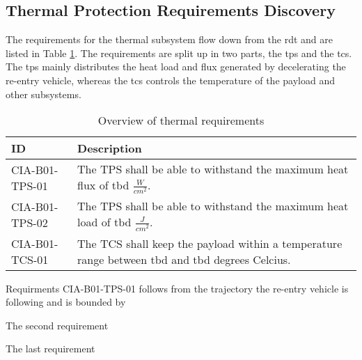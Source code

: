 \subsection{Thermal Protection Requirements Discovery} \label{sec:therm}
The requirements for the thermal subsystem flow down from the \gls{rdt} and are listed in Table \ref{tab:thermalreq}. The requirements are split up in two parts, the \gls{tps} and the \gls{tcs}. The \gls{tps} mainly distributes the heat load and flux generated by decelerating the re-entry vehicle, whereas the \gls{tcs} controls the temperature of the payload and other subsystems.


\begin{table}[H]
	\caption{Overview of thermal requirements}
	\begin{tabular}{|p{}|p{}|}
    \hline
    ID          & Description                                                                                                      \\ \hline \hline
    CIA-B01-TPS-01 & The TPS shall be able to withstand the maximum heat flux of \gls{tbd} $ \frac{W}{cm^2} $.               
\\ \hline
    CIA-B01-TPS-02 &  The TPS shall be able to withstand the maximum heat load of \gls{tbd} $ \frac{J}{cm^2} $.                
\\ \hline
    CIA-B01-TCS-01 & The TCS shall keep the payload within a temperature range between \gls{tbd} and \gls{tbd} degrees Celcius.                                            
\\ \hline
    \end{tabular}
    \label{tab:thermalreq}
\end{table}

Requirments CIA-B01-TPS-01 follows from the trajectory the re-entry vehicle is following and is bounded by 

The second requirement

The last requirement